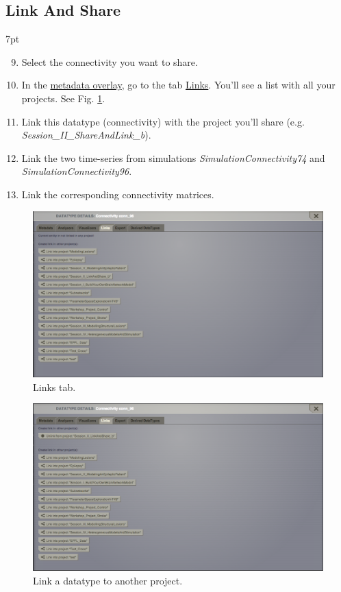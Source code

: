 \documentclass{tufte-handout}
\newenvironment{formal}{%
  \def\FrameCommand{%
    \hspace{1pt}%
    {\color{DarkBlue}\vrule width 2pt}%
    {\color{formalshade}\vrule width 4pt}%
    \colorbox{formalshade}%
  }%
  \MakeFramed{\advance\hsize-\width\FrameRestore}%
  \noindent\hspace{-4.55pt}%
  \begin{adjustwidth}{}{7pt}%
  \vspace{2pt}\vspace{2pt}%
}
{%
  \vspace{2pt}\end{adjustwidth}\endMakeFramed%
}
\begin{document}
\subsection{Link And Share}\label{sec:link_and_share}
\begin{formal}
\begin{enumerate}[resume]
\setcounter{enumi}{8}
\item Select the connectivity you want to share.
\item In the \underline{metadata overlay}, go to the tab \underline{Links}. You'll see a list with all your projects. See Fig. \ref{fig:linkstab}.
\item Link this datatype (connectivity) with the project you'll share (e.g. \textit{Session\_II\_ShareAndLink\_b}).
\item Link the two time-series from simulations \textit{SimulationConnectivity74} and \textit{SimulationConnectivity96}.
\item Link the corresponding connectivity matrices.
\end{enumerate}
\end{formal} 

\begin{figure}[h]
  \includegraphics[width=\linewidth]{Handout_UI_LinkAndShare_LinksTab}%
  \caption{Links tab.}%
  \label{fig:linkstab}%
\end{figure}

\begin{figure}[h]
  \includegraphics[width=\linewidth]{Handout_UI_LinkAndShare_LinkedProject}%
  \caption{Link a datatype to another project.}%
  \label{fig:linkproject}%
\end{figure}
\end{document}
